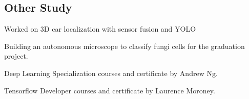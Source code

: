 \documentclass[letter, 14pt]{article}
\begin{document}
\subsection{Other Study}
\subtext{}
\begin{zitemize}
\item Worked on 3D car localization with sensor fusion and YOLO 
 \href{https://www.youtube.com/watch?v=FBLalZQ7VFo}{\color{black}\externallink}
\item Building an autonomous microscope to classify fungi cells for the graduation project.
\href{https://github.com/denizberkin/grad-project-without-database}{\color{black}\externallink}
\item Deep Learning Specialization courses and certificate by Andrew Ng. 
\href{https://www.coursera.org/account/accomplishments/specialization/certificate/WNJCS69WKCQ8}{\color{black}\externallink}
\item Tensorflow Developer courses and certificate by Laurence Moroney. 
\href{https://www.coursera.org/account/accomplishments/specialization/certificate/3WKMBQ8CVFY4}{\color{black}\externallink}
\end{zitemize}
\end{document}
